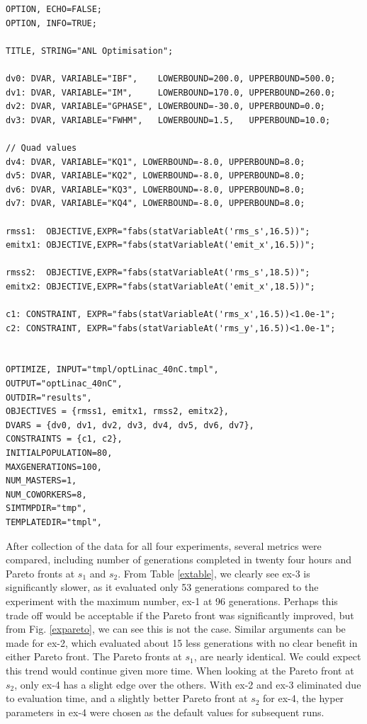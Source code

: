 \begin{Verbatim}[fontsize=\scriptsize]
OPTION, ECHO=FALSE;
OPTION, INFO=TRUE;

TITLE, STRING="ANL Optimisation";

dv0: DVAR, VARIABLE="IBF",    LOWERBOUND=200.0, UPPERBOUND=500.0;
dv1: DVAR, VARIABLE="IM",     LOWERBOUND=170.0, UPPERBOUND=260.0;
dv2: DVAR, VARIABLE="GPHASE", LOWERBOUND=-30.0, UPPERBOUND=0.0;
dv3: DVAR, VARIABLE="FWHM",   LOWERBOUND=1.5,   UPPERBOUND=10.0;

// Quad values
dv4: DVAR, VARIABLE="KQ1", LOWERBOUND=-8.0, UPPERBOUND=8.0;
dv5: DVAR, VARIABLE="KQ2", LOWERBOUND=-8.0, UPPERBOUND=8.0;
dv6: DVAR, VARIABLE="KQ3", LOWERBOUND=-8.0, UPPERBOUND=8.0;
dv7: DVAR, VARIABLE="KQ4", LOWERBOUND=-8.0, UPPERBOUND=8.0;

rmss1:  OBJECTIVE,EXPR="fabs(statVariableAt('rms_s',16.5))";
emitx1: OBJECTIVE,EXPR="fabs(statVariableAt('emit_x',16.5))";

rmss2:  OBJECTIVE,EXPR="fabs(statVariableAt('rms_s',18.5))";
emitx2: OBJECTIVE,EXPR="fabs(statVariableAt('emit_x',18.5))";

c1: CONSTRAINT, EXPR="fabs(statVariableAt('rms_x',16.5))<1.0e-1";
c2: CONSTRAINT, EXPR="fabs(statVariableAt('rms_y',16.5))<1.0e-1";


OPTIMIZE, INPUT="tmpl/optLinac_40nC.tmpl",
OUTPUT="optLinac_40nC",
OUTDIR="results",
OBJECTIVES = {rmss1, emitx1, rmss2, emitx2},
DVARS = {dv0, dv1, dv2, dv3, dv4, dv5, dv6, dv7},
CONSTRAINTS = {c1, c2},
INITIALPOPULATION=80,
MAXGENERATIONS=100,
NUM_MASTERS=1,
NUM_COWORKERS=8,
SIMTMPDIR="tmp",
TEMPLATEDIR="tmpl",
\end{Verbatim}

After collection of the data for all four experiments, several metrics
were compared, including number of generations completed in twenty four hours and
Pareto fronts at $s_1$ and $s_2$.
From Table \ref{extable}, we clearly see ex-3 is significantly 
slower, as it evaluated only 53 generations 
compared to the experiment with the maximum number, ex-1 at 96 generations.
Perhaps this trade off would be acceptable if the Pareto front was significantly 
improved, but from Fig. \ref{expareto}, we can see this is not the case.
Similar arguments can be made for ex-2, which evaluated about 15 less generations
with no clear benefit in either Pareto front.
The Pareto fronts at $s_1$, are nearly identical. We could expect
this trend would continue given more time. 
When looking at the Pareto front at $s_2$, only ex-4 has a slight 
edge over the others.
With ex-2 and ex-3 eliminated due to evaluation time, 
and a slightly better Pareto front at $s_2$ for ex-4, the hyper parameters in ex-4 were chosen as the default values for subsequent runs.


